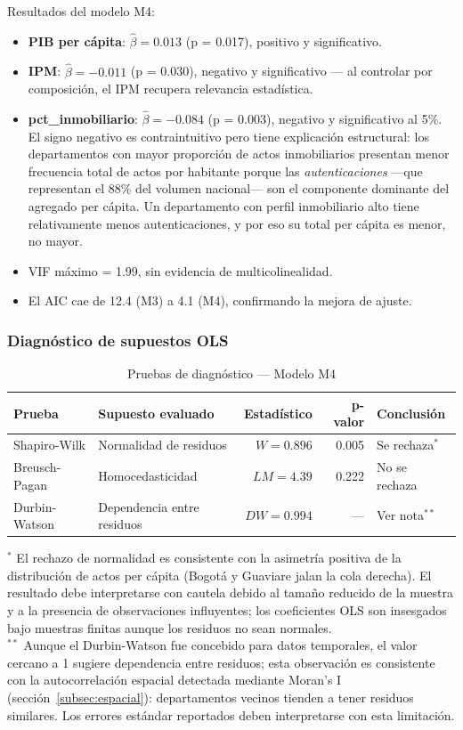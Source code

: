 \documentclass{article}
\begin{document}
Resultados del modelo M4:
\begin{itemize}
    \item \textbf{PIB per cápita}: $\hat{\beta}=0.013$ (p = 0.017), positivo y significativo.
    \item \textbf{IPM}: $\hat{\beta}=-0.011$ (p = 0.030), negativo y significativo —
    al controlar por composición, el IPM recupera relevancia estadística.
    \item \textbf{pct\_inmobiliario}: $\hat{\beta}=-0.084$ (p = 0.003), negativo y
    significativo al 5\%. El signo negativo es contraintuitivo pero
    tiene explicación estructural: los departamentos con mayor proporción
    de actos inmobiliarios presentan menor frecuencia total de actos por habitante
    porque las \emph{autenticaciones} —que representan el 88\% del volumen
    nacional— son el componente dominante del agregado per cápita. Un departamento
    con perfil inmobiliario alto tiene relativamente menos autenticaciones, y
    por eso su total per cápita es menor, no mayor.
    \item VIF máximo = 1.99, sin evidencia de multicolinealidad.
    \item El AIC cae de 12.4 (M3) a 4.1 (M4), confirmando la mejora de ajuste.
\end{itemize}

\subsubsection*{Diagnóstico de supuestos OLS}

\begin{table}[H]
\centering
\small
\caption{Pruebas de diagnóstico — Modelo M4}
\begin{tabular}{llrrl}
\toprule
\textbf{Prueba} & \textbf{Supuesto evaluado} & \textbf{Estadístico} &
\textbf{p-valor} & \textbf{Conclusión} \\
\midrule
Shapiro-Wilk   & Normalidad de residuos   & $W=0.896$ & 0.005 &
Se rechaza$^{*}$ \\
Breusch-Pagan  & Homocedasticidad         & $LM=4.39$ & 0.222 &
No se rechaza \\
Durbin-Watson  & Dependencia entre residuos & $DW=0.994$ & — &
Ver nota$^{**}$ \\
\bottomrule
\end{tabular}
\end{table}

\noindent$^{*}$ El rechazo de normalidad es consistente con la asimetría
positiva de la distribución de actos per cápita (Bogotá y Guaviare
jalan la cola derecha). El resultado debe interpretarse con cautela
debido al tamaño reducido de la muestra y a la presencia de
observaciones influyentes; los coeficientes OLS son insesgados bajo
muestras finitas aunque los residuos no sean normales.\\[2pt]
\noindent$^{**}$ Aunque el Durbin-Watson fue concebido para datos
temporales, el valor cercano a 1 sugiere dependencia entre residuos;
esta observación es consistente con la autocorrelación espacial
detectada mediante Moran's I (sección~\ref{subsec:espacial}):
departamentos vecinos tienden a tener residuos similares. Los errores
estándar reportados deben interpretarse con esta limitación.
\end{document}
